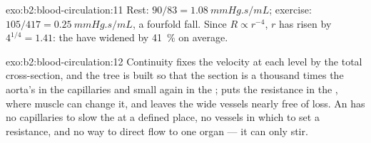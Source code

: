 \begin{solution}{exo:b2:blood-circulation:11}
Rest: $90/83 = \qty{1.08}{mmHg.s/mL}$; exercise: $105/417 =
\qty{0.25}{mmHg.s/mL}$, a fourfold fall. Since $R \propto r^{-4}$,
$r$ has risen by $4^{1/4} = 1.41$: the  have widened by
\qty{41}{\%} on average.
\end{solution}

\begin{solution}{exo:b2:blood-circulation:12}
Continuity fixes the velocity at each level by the total
cross-section, and the tree is built so that the section is a
thousand times the aorta's in the capillaries and small again in
the ;  puts the resistance in the ,
where muscle can change it, and leaves the wide vessels nearly free
of loss. An  has no capillaries to slow the  at
a defined place, no vessels in which to set a resistance, and no way
to direct flow to one organ --- it can only stir.
\end{solution}

